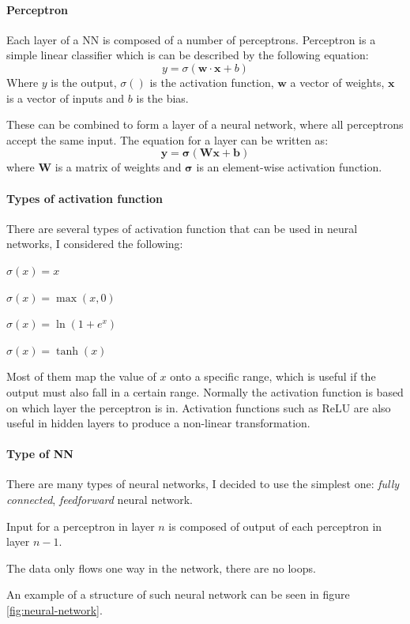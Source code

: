 \documentclass[12pt,a4paper]{book}
\newcommand\bs[1]{\boldsymbol{#1}}
\begin{document}
\paragraph{Perceptron}
Each layer of a NN is composed of a number of perceptrons.
Perceptron is a simple linear classifier which is can be described by the following equation:
\begin{equation*}
y = \sigma(\bs{w\cdot x}+b)
\end{equation*}
Where $y$ is the output, $\sigma()$ is the activation function, $\bs{w}$ a vector of weights, $\bs{x}$ is a vector of inputs and $b$ is the bias.

These can be combined to form a layer of a neural network, where all perceptrons accept the same input.
The equation for a layer can be written as:
\begin{equation*}
\bs{y} = \bs{\sigma}(\bs{W}\bs{x}+\bs{b})
\end{equation*}
where $\bs{W}$ is a matrix of weights and $\bs{\sigma}$ is an element-wise activation function.

\paragraph{Types of activation function}
There are several types of activation function that can be used in neural networks, I considered the following:
\begin{description}[labelwidth=\widthof{\bfseries Rectified Linear Unit (ReLU) }]
\item[Identity/Linear] $\sigma(x) = x$
\item[Rectified Linear Unit (ReLU)] $\sigma(x) = \max(x,0)$
\item[Softplus] $\sigma(x) = \ln(1+e^x)$
\item[TanH] $\sigma(x) = \tanh(x)$
\end{description}
Most of them map the value of $x$ onto a specific range, which is useful if the output must also fall in a certain range.
Normally the activation function is based on which layer the perceptron is in.
Activation functions such as ReLU are also useful in hidden layers to produce a non-linear transformation.

\paragraph{Type of NN}
There are many types of neural networks, I decided to use the simplest one: \emph{fully connected}, \emph{feedforward} neural network.
\begin{description}[labelwidth=\widthof{\bfseries Fully connected }]
\item[Fully connected] Input for a perceptron in layer $n$ is composed of output of each perceptron in layer $n-1$.
\item[Feedforward] The data only flows one way in the network, there are no loops.
\end{description}
An example of a structure of such neural network can be seen in figure \ref{fig:neural-network}.
\end{document}

